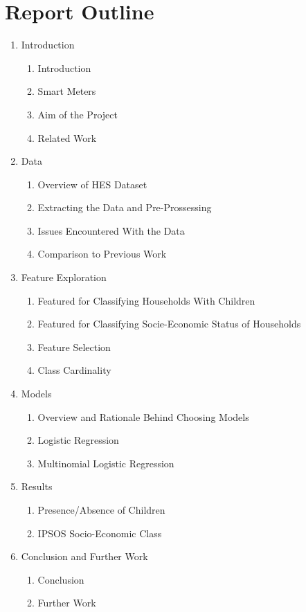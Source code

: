 \documentclass[12pt,a4paper]{article}
\begin{document}
\section*{Report Outline}
\begin{enumerate}
	\item Introduction
		\begin{enumerate}
			\item Introduction
			\item Smart Meters
			\item Aim of the Project
			\item Related Work
		\end{enumerate}
	\item Data
		\begin{enumerate}
			\item Overview of HES Dataset
			\item Extracting the Data and Pre-Prossessing 
			\item Issues Encountered With the Data
			\item Comparison to Previous Work
		\end{enumerate}
	\item Feature Exploration
		\begin{enumerate}
			\item Featured for Classifying Households With Children
			\item Featured for Classifying Socie-Economic Status of Households
			\item Feature Selection
			\item Class Cardinality
		\end{enumerate}
	\item Models
		\begin{enumerate}
			\item Overview and Rationale Behind Choosing Models
			\item Logistic Regression
			\item Multinomial Logistic Regression
		\end{enumerate}
	\item Results
		\begin{enumerate}
			\item Presence/Absence of Children
			\item IPSOS Socio-Economic Class
		\end{enumerate}
	\item Conclusion and Further Work
		\begin{enumerate}
			\item Conclusion
			\item Further Work
		\end{enumerate}
\end{enumerate}
\end{document}
